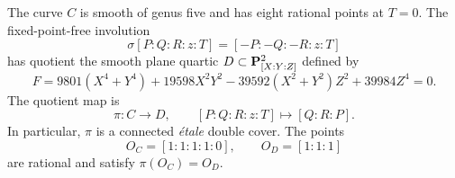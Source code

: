 \begin{proposition}
\label{prop:theta-quotient}
The curve $C$ is smooth of genus five and has eight rational points at
$T=0$.  The fixed-point-free involution
\[
 \sigma[P:Q:R:z:T]=[-P:-Q:-R:z:T]
\]
has quotient the smooth plane quartic $D\subset\mathbf P^2_{[X:Y:Z]}$ defined by
\begin{equation}
 F=9801(X^4+Y^4)+19598X^2Y^2
       -39592(X^2+Y^2)Z^2+39984Z^4=0.
 \label{eq:theta-quartic}
\end{equation}
The quotient map is
\[
 \pi:C\longrightarrow D,\qquad [P:Q:R:z:T]\longmapsto[Q:R:P].
\]
In particular, $\pi$ is a connected \emph{\'etale} double cover.  The points
\[
 O_C=[1:1:1:1:0],\qquad O_D=[1:1:1]
\]
are rational and satisfy $\pi(O_C)=O_D$.
\end{proposition}

